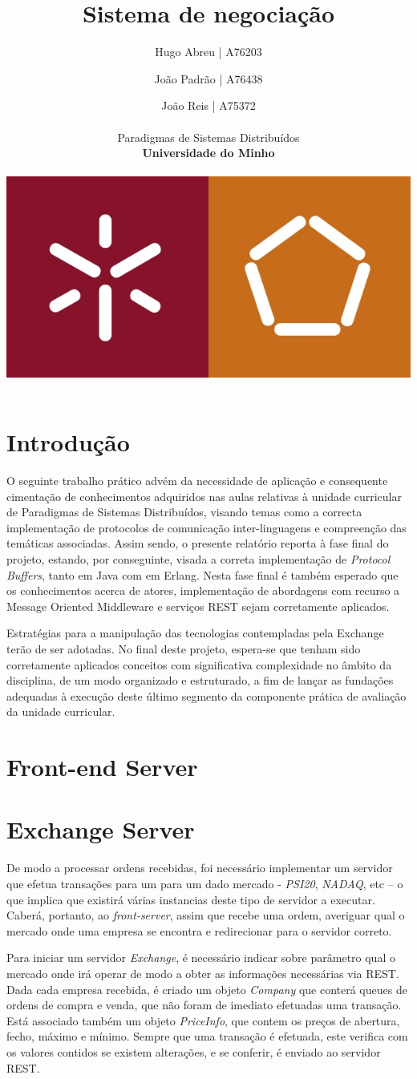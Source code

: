 \documentclass[a4paper,12pt]{article}
\title{Sistema de negociação}
\author{Hugo Abreu | A76203 \and João Padrão | A76438\and João Reis | A75372
\\\\ Paradigmas de Sistemas Distribuídos \\ \textbf{Universidade do Minho} \\ \\ \includegraphics[scale=0.25]{um_eeng}}
\begin{document}
\maketitle


\section{Introdução}
O seguinte trabalho prático advém da necessidade de aplicação e consequente cimentação de conhecimentos adquiridos nas aulas relativas à unidade curricular de Paradigmas de Sistemas Distribuídos, visando temas como a correcta implementação de protocolos de comunicação inter-linguagens e compreenção das temáticas associadas. Assim sendo, o presente relatório reporta à fase final do projeto, estando, por conseguinte, visada a correta implementação de \textit{Protocol Buffers}, tanto em Java com em Erlang. Nesta fase final é também esperado que os conhecimentos acerca de atores, implementação de abordagens com recurso a Message Oriented Middleware e serviços REST sejam corretamente aplicados. 
\par Estratégias para a manipulação das tecnologias contempladas pela Exchange terão de ser adotadas. No final deste projeto, espera-se que tenham sido corretamente aplicados conceitos com significativa complexidade no âmbito da disciplina, de um modo organizado e estruturado, a fim de lançar as fundações adequadas à execução deste último segmento da componente prática de avaliação da unidade curricular.

\section{Front-end Server}

\section{Exchange Server}

\par De modo a processar ordens recebidas, foi necessário implementar um servidor que efetua transações para um para um dado mercado - \textit{PSI20}, \textit{NADAQ}, etc – o que implica que existirá várias instancias deste tipo de servidor a executar. Caberá, portanto, ao \textit{front-server}, assim que recebe uma ordem, averiguar qual o mercado onde uma empresa se encontra e redirecionar para o servidor correto. 

\par Para iniciar um servidor \textit{Exchange}, é necessário indicar sobre parâmetro qual o mercado onde irá operar de modo a obter as informações necessárias via REST. Dada cada empresa recebida, é criado um objeto \textit{Company} que conterá queues de ordens de compra e venda, que não foram de imediato efetuadas uma transação. Está associado também um objeto \textit{PriceInfo}, que contem os preços de abertura, fecho, máximo e mínimo. Sempre que uma transação é efetuada, este verifica com os valores contidos se existem alterações, e se conferir, é enviado ao servidor REST.
\end{document}
